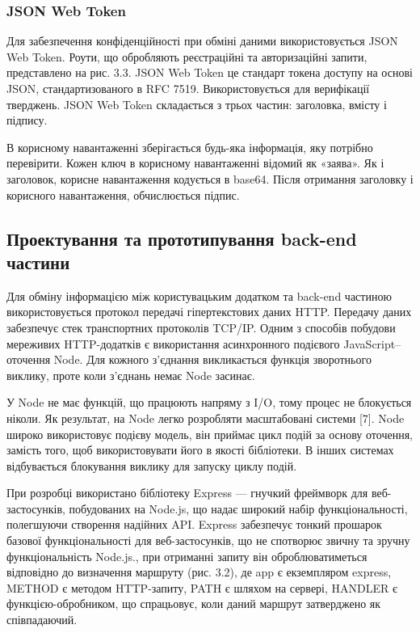\subsubsection{JSON Web Token}
Для забезпечення конфіденційності при обміні даними використовується JSON Web Token. Роути, що обробляють реєстраційні та авторизаційні запити, представлено на рис. 3.3.
JSON Web Token це стандарт токена доступу на основі JSON, стандартизованого в RFC 7519. Використовується для верифікації тверджень. JSON Web Token складається з трьох частин: заголовка, вмісту і підпису.

В корисному навантаженні зберігається будь-яка інформація, яку потрібно перевірити. Кожен ключ в корисному навантаженні відомий як «заява». Як і заголовок, корисне навантаження кодується в base64. Після отримання заголовку і корисного навантаження, обчислюється підпис.

\subsection{Проектування та прототипування back-end частини}
Для обміну інформацією між користувацьким додатком та back-end частиною використовується протокол передачі гіпертекстових даних HTTP. Передачу даних забезпечує стек транспортних протоколів TCP/IP.
Одним з способів побудови мереживих HTTP-додатків є використання  асинхронного подієвого JavaScript–оточення Node. Для кожного з’єднання викликається функція зворотнього виклику, проте коли з’єднань немає Node засинає.

У Node не має функцій, що працюють напряму з I/O, тому процес не блокується ніколи. Як результат, на Node легко розробляти масштабовані системи [7].
Node широко використовує подієву модель, він приймає цикл подій за основу оточення, замість того, щоб використовувати його в якості бібліотеки. В інших системах відбувається блокування виклику для запуску циклу подій.

При розробці використано бібліотеку Express — гнучкий фреймворк для веб-застосунків, побудованих на Node.js, що надає широкий набір функціональності, полегшуючи створення надійних API.
Express забезпечує тонкий прошарок базової функціональності для веб-застосунків, що не спотворює звичну та зручну функціональність Node.js., при отриманні запиту він оброблюватиметься відповідно до визначення маршруту (рис. 3.2), де app є екземпляром express, METHOD є методом HTTP-запиту, PATH є шляхом на сервері, HANDLER є функцією-обробником, що спрацьовує, коли даний маршрут затверджено як співпадаючий.

